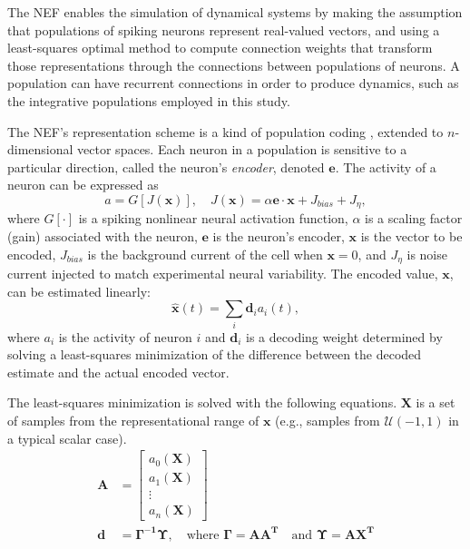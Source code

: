 \documentclass[11pt]{article}
\begin{document}
The NEF enables the simulation of dynamical systems
by making the assumption that populations of spiking neurons
represent real-valued vectors,
and using a least-squares optimal method
to compute connection weights that
transform those representations
through the connections between
populations of neurons.
A population can have recurrent connections
in order to produce dynamics,
such as the integrative populations
employed in this study.

The NEF's representation scheme
is a kind of population coding
\cite{Georgopoulos1986,Salinas1994},
extended to $n$-dimensional vector spaces.
Each neuron in a population is sensitive
to a particular direction,
called the neuron's \textit{encoder}, denoted $\mathbf{e}$.
The activity of a neuron can be expressed as
\begin{equation} \label{eq:activity}
  a = G[J(\mathbf{x})], \quad
  J(\mathbf{x}) = \alpha \mathbf{e} \cdot \mathbf{x} + J_{bias} + J_\eta,
\end{equation}
where $G[\cdot]$ is a spiking nonlinear neural activation function,
$\alpha$ is a scaling factor (gain) associated with the neuron,
$\mathbf{e}$ is the neuron's encoder,
$\mathbf{x}$ is the vector to be encoded,
$J_{bias}$ is the background current of the cell
when $\mathbf{x} = 0$,
and $J_\eta$ is noise current injected
to match experimental neural variability.
The encoded value, $\mathbf{x}$,
can be estimated linearly:
\begin{equation*}
  \mathbf{\hat{x}}(t) = \sum_i \mathbf{d}_i a_i(t),
\end{equation*}
where $a_i$ is the activity of neuron $i$
and $\mathbf{d}_i$ is a decoding weight
determined by solving a least-squares minimization
of the difference between the decoded estimate
and the actual encoded vector.

The least-squares minimization is solved
with the following equations.
$\mathbf{X}$ is a set of samples from
the representational range of
$\mathbf{x}$ (e.g., samples from $\mathcal{U}(-1, 1)$
in a typical scalar case).
\begin{align*}
  \mathbf{A} &= \begin{bmatrix}
                 a_0(\mathbf{X}) \\
                 a_1(\mathbf{X}) \\
                 \vdots \\
                 a_n(\mathbf{X})
               \end{bmatrix} \\
  \mathbf{d} &= \mathbf{\Gamma^{-1} \Upsilon}, \quad \text{where }
  \mathbf{\Gamma} = \mathbf{AA^T} \quad \text{and } \mathbf{\Upsilon} = \mathbf{AX^T}
\end{align*}
\end{document}
